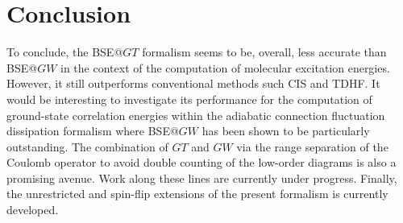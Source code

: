 \documentclass[aip,jcp,reprint,noshowkeys,superscriptaddress]{revtex4-1}
\begin{document}
\section{Conclusion}
\label{sec:ccl}
To conclude, the BSE@$GT$ formalism seems to be, overall, less accurate than BSE@$GW$ in the context of the computation of molecular excitation energies.
However, it still outperforms conventional methods such CIS and TDHF.
It would be interesting to investigate its performance for the computation of ground-state correlation energies within the adiabatic connection fluctuation dissipation formalism where BSE@$GW$ has been shown to be particularly outstanding. \cite{Maggio_2016,Holzer_2018b,Loos_2020e}
The combination of $GT$ and $GW$ via the range separation of the Coulomb operator to avoid double counting of the low-order diagrams is also a promising avenue.
Work along these lines are currently under progress.
Finally, the unrestricted and spin-flip extensions of the present formalism is currently developed.



\end{document}
